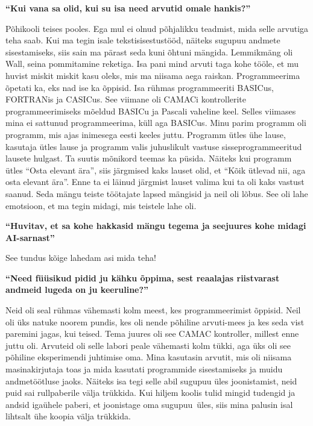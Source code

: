 \textbf{\enquote{Kui vana sa olid, kui su isa need arvutid omale hankis?}}

Põhikooli teises pooles. Ega mul ei olnud põhjalikku teadmist, mida selle arvutiga teha saab. Kui ma tegin isale tekstisisestustööd, näiteks sugupuu andmete sisestamiseks, siis sain ma pärast seda kuni õhtuni mängida. Lemmikmäng oli Wall, seina pommitamine reketiga. Isa pani mind arvuti taga kohe tööle, et mu huvist miskit miskit kasu oleks, mis ma niisama aega raiskan. Programmeerima õpetati ka, eks nad ise ka õppisid. Isa rühmas programmeeriti BASICus, FORTRANis ja CASICus. See viimane oli CAMACi kontrollerite programmeerimiseks mõeldud BASICu ja Pascali vaheline keel. Selles viimases mina ei sattunud programmeerima, küll aga BASICus. Minu parim programm oli programm, mis ajas inimesega eesti keeles juttu. Programm ütles ühe lause, kasutaja ütles lause ja programm valis juhuslikult vastuse sisseprogrammeeritud lausete hulgast. Ta suutis mõnikord teemas ka püsida. Näiteks kui programm ütles \enquote{Osta elevant ära}, siis järgmised kaks lauset olid, et \enquote{Kõik ütlevad nii, aga osta elevant ära}. Enne ta ei läinud järgmist lauset valima kui ta oli kaks vastust saanud. Seda mängu teiste töötajate lapsed mängisid ja neil oli lõbus. See oli lahe emotsioon, et ma tegin midagi, mis teistele lahe oli. 

\textbf{\enquote{Huvitav, et sa kohe hakkasid mängu tegema ja seejuures kohe midagi AI-sarnast}}

See tundus kõige lahedam asi mida teha! 

\textbf{\enquote{Need füüsikud pidid ju kähku õppima, sest reaalajas riistvarast andmeid lugeda on ju keeruline?}}

Neid oli seal rühmas vähemasti kolm meest, kes programmeerimist õppisid. Neil oli üks natuke noorem pundis, kes oli nende põhiline arvuti-mees ja kes seda vist paremini jagas, kui teised. Tema juures oli see CAMAC kontroller, millest enne juttu oli. Arvuteid oli selle labori peale vähemasti kolm tükki,  aga üks oli see põhiline eksperimendi juhtimise oma. Mina kasutasin arvutit, mis oli niisama masinakirjutaja toas ja mida kasutati programmide sisestamiseks ja muidu andmetöötluse jaoks. Näiteks isa tegi selle abil sugupuu üles joonistamist, neid puid sai rullpaberile välja trükkida. Kui hiljem koolis tulid mingid tudengid ja andsid igaühele paberi, et joonistage oma sugupuu üles, siis mina palusin isal lihtsalt ühe koopia välja trükkida. 

